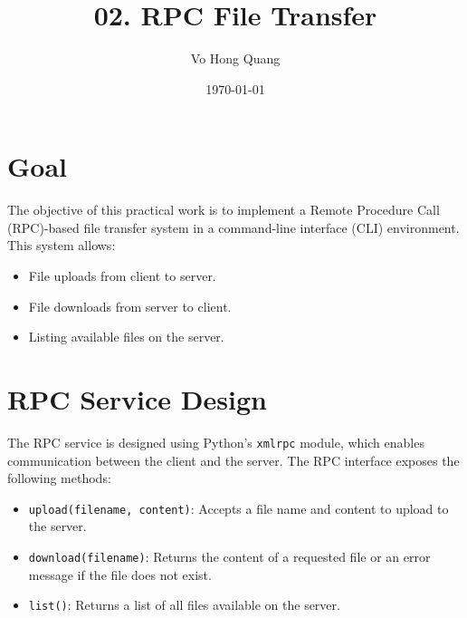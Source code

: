 \documentclass[a4paper,12pt]{article}
\title{02. RPC File Transfer}
\author{Vo Hong Quang}
\date{\today}
\begin{document}
\maketitle

\section*{Goal}
The objective of this practical work is to implement a Remote Procedure Call (RPC)-based file transfer system in a command-line interface (CLI) environment. This system allows:
\begin{itemize}
    \item File uploads from client to server.
    \item File downloads from server to client.
    \item Listing available files on the server.
\end{itemize}

\section*{RPC Service Design}
The RPC service is designed using Python's \texttt{xmlrpc} module, which enables communication between the client and the server. The RPC interface exposes the following methods:
\begin{itemize}
    \item \texttt{upload(filename, content)}: Accepts a file name and content to upload to the server.
    \item \texttt{download(filename)}: Returns the content of a requested file or an error message if the file does not exist.
    \item \texttt{list()}: Returns a list of all files available on the server.
\end{itemize}
\end{document}
